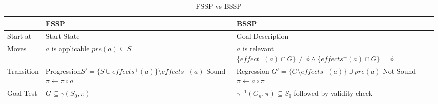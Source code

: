 \documentclass[a4paper]{article}
\begin{document}
\begin{table}[H]
    \centering
    \begin{tabular}{|p{15mm}|p{60mm}|p{75mm}|}
        \hline
         & FSSP & BSSP \\
         \hline
        Start at & Start State & Goal Description\\
        \hline
        Moves & $a$ is applicable \newline $pre(a)\subseteq S$ & $a$ is relevant \newline $\{effect^+(a)\cap G\}\neq \phi \land \{effects^-(a)\cap G\}=\phi$\\
        \hline
        Transition & Progression\newline $S'=\{S\cup effects^+(a)\}\text{\textbackslash}effects^-(a)$ \newline Sound \newline $\pi \gets \pi \circ a$ & Regression \newline $G'=\{G\text{\textbackslash}effects^+(a)\} \cup pre(a)$ \newline Not Sound \newline $\pi \gets a\circ \pi$\\
        \hline
        Goal Test & $G\subseteq \gamma(S_0,\pi)$ & $\gamma^{-1}(G_n,\pi)\subseteq S_0$ \newline followed by validity check\\
        \hline
    \end{tabular}
    \caption{FSSP vs BSSP}
\end{table}
\pagebreak
\end{document}
